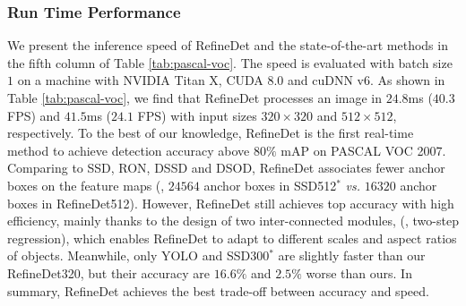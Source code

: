 \documentclass[10pt,twocolumn,letterpaper]{article}
\begin{document}
\subsubsection{Run Time Performance}
We present the inference speed of RefineDet and the state-of-the-art methods in the fifth column of Table \ref{tab:pascal-voc}. The speed is evaluated with batch size $1$ on a machine with NVIDIA Titan X, CUDA 8.0 and cuDNN v6. As shown in Table \ref{tab:pascal-voc}, we find that RefineDet processes an image in $24.8$ms ($40.3$ FPS) and $41.5$ms ($24.1$ FPS) with input sizes $320\times320$ and $512\times512$, respectively. To the best of our knowledge, RefineDet is the first real-time method to achieve detection accuracy above $80\%$ mAP on PASCAL VOC 2007. Comparing to SSD, RON, DSSD and DSOD, RefineDet associates fewer anchor boxes on the feature maps (\eg, $24564$ anchor boxes in SSD512$^*$\cite{DBLP:conf/eccv/LiuAESRFB16} {\it vs.} $16320$ anchor boxes in RefineDet512). However, RefineDet still achieves top accuracy with high efficiency, mainly thanks to the design of two inter-connected modules, (\eg, two-step regression), which enables RefineDet to adapt to different scales and aspect ratios of objects. Meanwhile, only YOLO and SSD300$^*$ are slightly faster than our RefineDet320, but their accuracy are $16.6\%$ and $2.5\%$ worse than ours. In summary, RefineDet achieves the best trade-off between accuracy and speed.
\end{document}
